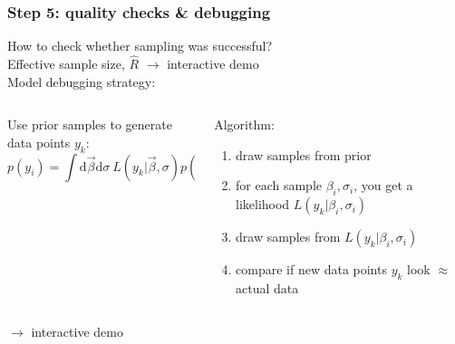 \documentclass[t,aspectratio=169]{beamer}
\renewcommand{\d}{\mathrm{d}}
\begin{document}
\begin{frame}
  \frametitle{Step 5: quality checks \& debugging}
  How to check whether sampling was successful?\\
  Effective sample size, $\hat R$ $\rightarrow$ interactive demo\\
  \bigskip
  \bigskip
  Model debugging strategy:
  \begin{columns}
    \begin{column}[T]{0.55\textwidth}
      \begin{tcolorbox}[title=Prior predictive check]
        Use prior samples to generate data points $y_k$:
        \begin{equation*}
          p(y_i) = \int \d \vec \beta \d \sigma \ L(y_k|\vec \beta, \sigma) p(\vec \beta) p(\sigma)
        \end{equation*}
      \end{tcolorbox}
    \end{column}
    \begin{column}[T]{0.4\textwidth}
      Algorithm:
      \begin{enumerate}
      \item draw samples from prior
      \item for each sample $\beta_i, \sigma_i$, you get a likelihood $L(y_k|\beta_i, \sigma_i)$
      \item draw samples from $L(y_k|\beta_i, \sigma_i)$
      \item compare if new data points $y_k$ look $\approx$ actual data
      \end{enumerate}
    \end{column}
  \end{columns}
  $\rightarrow$ interactive demo
\end{frame}
\end{document}
